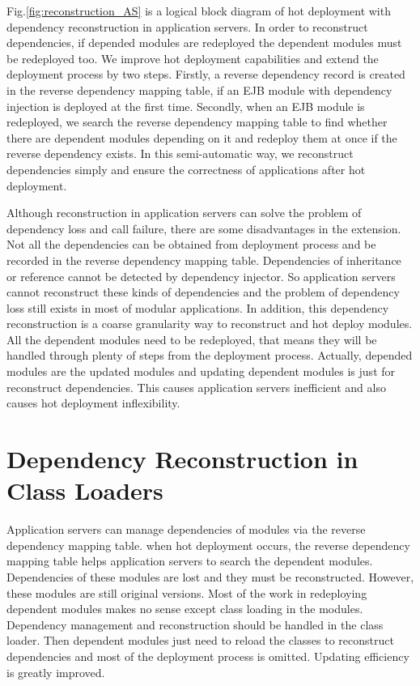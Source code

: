 \documentclass[conference]{IEEEtran}
\begin{document}
Fig.\ref{fig:reconstruction_AS} is a logical block diagram of hot deployment with dependency reconstruction in application servers.
In order to reconstruct dependencies, if depended modules are redeployed the dependent modules must be redeployed too.  
We improve hot deployment capabilities and extend the deployment process by two steps. 
Firstly, a reverse dependency record is created in the reverse dependency mapping table, if an EJB module with dependency injection is deployed at the first time.
Secondly, when an EJB module is redeployed, we search the reverse dependency mapping table to find whether there are dependent modules depending on it and redeploy them at once if the reverse dependency exists.
In this semi-automatic way, we reconstruct dependencies simply and ensure the correctness of applications after hot deployment.

Although reconstruction in application servers can solve the problem of dependency loss and call failure, there are some disadvantages in the extension.
Not all the dependencies can be obtained from deployment process and be recorded in the reverse dependency mapping table.
Dependencies of inheritance or reference cannot be detected by dependency injector.
So application servers cannot reconstruct these kinds of dependencies and the problem of dependency loss still exists in most of modular applications.
In addition, this dependency reconstruction is a coarse granularity way to reconstruct and hot deploy modules.
All the dependent modules need to be redeployed, that means they will be handled through plenty of steps from the deployment process.
Actually, depended modules are the updated modules and updating dependent modules is just for reconstruct dependencies.
This causes application servers inefficient and also causes hot deployment inflexibility.

 
 
\section{Dependency Reconstruction in Class Loaders\label{sec:reconstructionCL}}

Application servers can manage dependencies of modules via the reverse dependency mapping table.
when hot deployment occurs, the reverse dependency mapping table helps application servers to search the dependent modules.
Dependencies of these modules are lost and they must be reconstructed.
However, these modules are still original versions.
Most of the work in redeploying dependent modules makes no sense except class loading in the modules.
Dependency management and reconstruction should be handled in the class loader.
Then dependent modules just need to reload the classes to reconstruct dependencies and most of the deployment process is omitted.
Updating efficiency is greatly improved.
\end{document}
